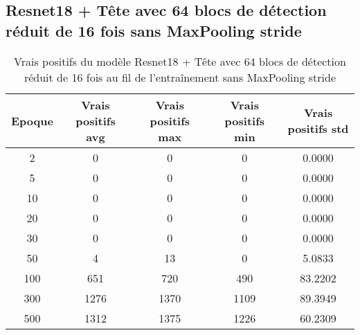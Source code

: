 
\clearpage
\subsection{Resnet18 + Tête avec 64 blocs de détection réduit de 16 fois sans MaxPooling stride}

\begin{table}[!ht]
    \caption{Vrais positifs du modèle Resnet18 + Tête avec 64 blocs de détection réduit de 16 fois au fil de l'entraînement sans MaxPooling stride}
    \label{tab:resnet18+head_64n_reduced_16x_true_positive_wo_maxpool_stride}
    \centering
    \begin{tabular}{ |c||c|c|c|c|  }
        \hline
        \rowcolor{gray!50}
        Epoque & Vrais positifs avg & Vrais positifs max & Vrais positifs min & Vrais positifs std\\
        \hline
        2 & 0 & 0 & 0 & 0.0000\\
        5 & 0 & 0 & 0 & 0.0000\\
        10 & 0 & 0 & 0 & 0.0000\\
        20 & 0 & 0 & 0 & 0.0000\\
        30 & 0 & 0 & 0 & 0.0000\\
        50 & 4 & 13 & 0 & 5.0833\\
        100 & 651 & 720 & 490 & 83.2202\\
        300 & 1276 & 1370 & 1109 & 89.3949\\
        500 & 1312 & 1375 & 1226 & 60.2309\\
        \hline
    \end{tabular}
\end{table}

